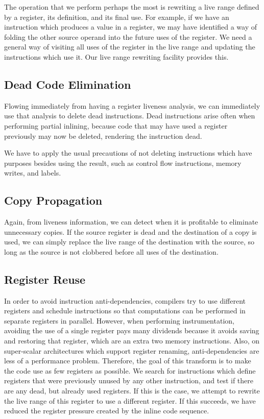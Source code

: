 The operation that we perform perhaps the most is rewriting a live range defined
by a register, its definition, and its final use.  For example, if we have an
instruction which produces a value in a register, we may have identified a way
of folding the other source operand into the future uses of the register.  We
need a general way of visiting all uses of the register in the live range and
updating the instructions which use it.  Our live range rewriting facility
provides this.

\subsection{Dead Code Elimination}

Flowing immediately from having a register liveness analysis, we can immediately
use that analysis to delete dead instructions.  Dead instructions arise often
when performing partial inlining, because code that may have used a register
previously may now be deleted, rendering the instruction dead.

We have to apply the usual precautions of not deleting instructions which have
purposes besides using the result, such as control flow instructions, memory
writes, and labels.

\subsection{Copy Propagation}

Again, from liveness information, we can detect when it is profitable to
eliminate unnecessary copies.  If the source register is dead and the
destination of a copy is used, we can simply replace the live range of the
destination with the source, so long as the source is not clobbered before all
uses of the destination.

\subsection{Register Reuse}

In order to avoid instruction anti-dependencies, compilers try to use different
registers and schedule instructions so that computations can be performed in
separate registers in parallel.  However, when performing instrumentation,
avoiding the use of a single register pays many dividends because it avoids
saving and restoring that register, which are an extra two memory instructions.
Also, on super-scalar architectures which support register
renaming\cite{reg_renaming}, anti-dependencies are less of a performance
problem.  Therefore, the goal of this transform is to make the code use as few
registers as possible.  We search for instructions which define registers that
were previously unused by any other instruction, and test if there are any dead,
but already used registers.  If this is the case, we attempt to rewrite the live
range of this register to use a different register.  If this succeeds, we have
reduced the register pressure created by the inline code sequence.

